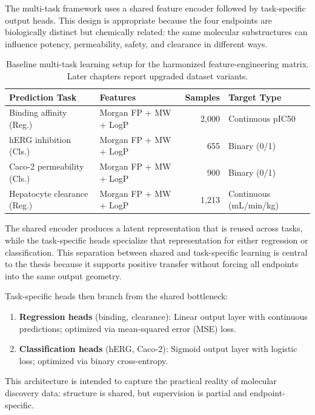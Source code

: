 \documentclass[a4paper,11pt,twoside]{report}
\begin{document}
The multi-task framework uses a shared feature encoder followed by task-specific output heads. This design is appropriate because the four endpoints are biologically distinct but chemically related: the same molecular substructures can influence potency, permeability, safety, and clearance in different ways.

\begin{table}[htbp]
\centering
\small
\caption{Baseline multi-task learning setup for the harmonized feature-engineering matrix. Later chapters report upgraded dataset variants.}
\label{tab:mtl_setup}
\begin{tabular}{p{3.0cm}|p{2.8cm}|r|p{2.6cm}}
\hline
\textbf{Prediction Task} & \textbf{Features} & \textbf{Samples} & \textbf{Target Type} \\
\hline
Binding affinity (Reg.) & Morgan FP + MW + LogP & 2,000 & Continuous pIC50 \\
hERG inhibition (Cls.) & Morgan FP + MW + LogP & 655 & Binary (0/1) \\
Caco-2 permeability (Cls.) & Morgan FP + MW + LogP & 900 & Binary (0/1) \\
Hepatocyte clearance (Reg.) & Morgan FP + MW + LogP & 1,213 & Continuous (mL/min/kg) \\
\hline
\end{tabular}
\end{table}

The shared encoder produces a latent representation that is reused across tasks, while the task-specific heads specialize that representation for either regression or classification. This separation between shared and task-specific learning is central to the thesis because it supports positive transfer without forcing all endpoints into the same output geometry.

Task-specific heads then branch from the shared bottleneck:
\begin{enumerate}
\item \textbf{Regression heads} (binding, clearance): Linear output layer with continuous predictions; optimized via mean-squared error (MSE) loss.
\item \textbf{Classification heads} (hERG, Caco-2): Sigmoid output layer with logistic loss; optimized via binary cross-entropy.
\end{enumerate}

This architecture is intended to capture the practical reality of molecular discovery data: structure is shared, but supervision is partial and endpoint-specific.
\end{document}
